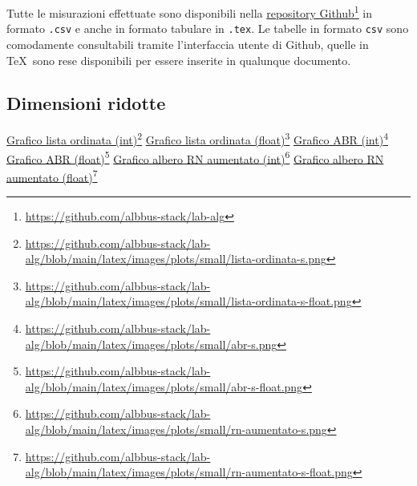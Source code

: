 \documentclass[onecolumn]{article}
\newcommand\anchor[2]{%
  \href{#2}{#1}\footnote{\url{#2}}%
}
\begin{document}
Tutte le misurazioni effettuate sono disponibili nella \anchor{repository Github}{https://github.com/albbus-stack/lab-alg} in formato \verb|.csv| e anche in formato tabulare in \verb|.tex|. Le tabelle in formato \verb|csv| sono comodamente consultabili tramite l'interfaccia utente di Github, quelle in \TeX\ sono rese disponibili per essere inserite in qualunque documento.

\subsection{Dimensioni ridotte}

\anchor{Grafico lista ordinata (int)}{https://github.com/albbus-stack/lab-alg/blob/main/latex/images/plots/small/lista-ordinata-s.png} \label{label:lista-ordinata-s}
\newline
\anchor{Grafico lista ordinata (float)}{https://github.com/albbus-stack/lab-alg/blob/main/latex/images/plots/small/lista-ordinata-s-float.png} \label{label:lista-ordinata-s-float}
\newline
\anchor{Grafico ABR (int)}{https://github.com/albbus-stack/lab-alg/blob/main/latex/images/plots/small/abr-s.png} \label{label:abr-s}
\newline
\anchor{Grafico ABR (float)}{https://github.com/albbus-stack/lab-alg/blob/main/latex/images/plots/small/abr-s-float.png} \label{label:abr-s-float}
\newline
\anchor{Grafico albero RN aumentato (int)}{https://github.com/albbus-stack/lab-alg/blob/main/latex/images/plots/small/rn-aumentato-s.png} \label{label:rn-aumentato-s}
\newline
\anchor{Grafico albero RN aumentato (float)}{https://github.com/albbus-stack/lab-alg/blob/main/latex/images/plots/small/rn-aumentato-s-float.png} \label{label:rn-aumentato-s-float}

\newpage
\end{document}
